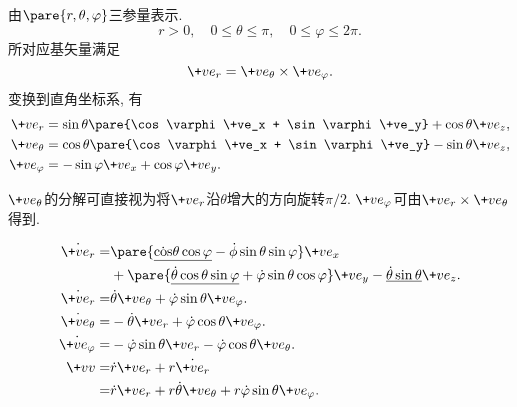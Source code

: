 \documentclass[../LectureNotes.tex]{subfiles}
\begin{document}
\begin{figure}[ht]
    \centering
\end{figure}
由$\pare{r,\theta,\varphi}$三参量表示.
\[ r>0,\quad 0\le\theta\le\pi,\quad 0\le\varphi\le 2\pi. \]
所对应基矢量满足
\[ \+ve_r = \+ve_\theta \times\+ve_\varphi. \]
变换到直角坐标系, 有
\begin{align*}
    \+ve_r &= \sin\theta\pare{\cos\varphi \+ve_x + \sin\varphi\+ve_y} + \cos\theta\+ve_z, \\
    \+ve_\theta &= \cos\theta\pare{\cos\varphi \+ve_x + \sin\varphi\+ve_y} -\sin\theta\+ve_z, \\
    \+ve_\varphi &= -\sin\varphi\+ve_x + \cos\varphi\+ve_y.
\end{align*}
\begin{remark}
    $\+ve_\theta$的分解可直接视为将$\+ve_r$沿$\theta$增大的方向旋转$\pi/2$. $\+ve_\varphi$可由$\+ve_r\times\+ve_\theta$得到.
\end{remark}
\begin{align*}
    \dot{\+ve_r} =& \pare{\underline{\dot\cos\theta\cos\varphi} - \dot{\phi}\sin\theta\sin\varphi}\+ve_x\\
    &+ \pare{\underline{\dot{\theta}\cos\theta\sin\varphi} + \dot{\varphi}\sin\theta\cos\varphi}\+ve_y - \underline{\dot{\theta}\sin\theta}\+ve_z.\\
    \dot{\+ve_r} =& \dot{\theta}\+ve_\theta + \dot{\varphi}\sin\theta\+ve_\varphi. \\
    \dot{\+ve_\theta} =& -\dot{\theta}\+ve_r + \dot{\varphi}\cos\theta\+ve_\varphi. \\
    \dot{\+ve_\varphi} =& -\dot{\varphi}\sin\theta\+ve_r - \dot{\varphi}\cos\theta\+ve_\theta. \\
    \+vv =& \dot{r}\+ve_r + r\dot{\+ve_r} \\
    =& \dot{r}\+ve_r + r\dot{\theta}\+ve_\theta+r\dot{\varphi}\sin\theta\+ve_\varphi.
\end{align*}
\begin{finale}
\end{finale}
\end{document}
